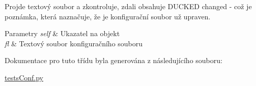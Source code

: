 Projde textový soubor a zkontroluje, zdali obsahuje D\-U\-C\-K\-E\-D changed -\/ což je poznámka, která naznačuje, že je konfigurační soubor už upraven. 


\begin{DoxyParams}{Parametry}
{\em self} & Ukazatel na objekt \\
\hline
{\em fl} & Textový soubor konfiguračního souboru \\
\hline
\end{DoxyParams}


Dokumentace pro tuto třídu byla generována z následujícího souboru\-:\begin{DoxyCompactItemize}
\item 
\hyperlink{testsConf_8py}{tests\-Conf.\-py}\end{DoxyCompactItemize}

